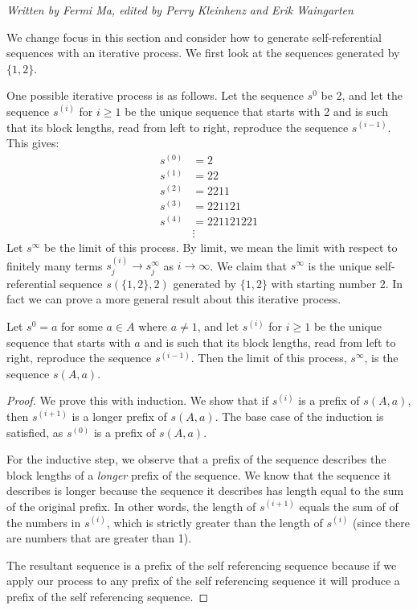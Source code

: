 \documentclass[runningheads,a4paper]{llncs}
\begin{document}
\emph{Written by Fermi Ma, edited by Perry Kleinhenz and Erik Waingarten}

We change focus in this section and consider how to generate self-referential sequences with an iterative process. We first look at the sequences generated by $\{1,2\}$.

One possible iterative process is as follows. Let the sequence $s^0$ be 2, and let the sequence $s^{(i)}$ for $i \geq 1$ be the unique sequence that starts with 2 and is such that its block lengths, read from left to right, reproduce the sequence $s^{(i-1)}$. This gives:
\begin{align*}
s^{(0)}&= 2\\
s^{(1)} &= 22\\
s^{(2)} &= 2211\\
s^{(3)}&= 221121\\
s^{(4)} &= 221121221\\
&\vdots
\end{align*}
Let $s^\infty$ be the limit of this process. 
By limit, we mean the limit with respect to finitely many terms $s^{(i)}_j \rightarrow s^\infty_j$ as $i \rightarrow \infty$. We claim that $s^\infty$ is the unique self-referential sequence $s(\{1,2\},2)$ generated by $\{1,2\}$ with starting number 2. In fact we can prove a more general result about this iterative process.

\begin{theorem}
Let $s^0 = a$ for some $a \in A$ where $a \neq 1$, and let $s^{(i)}$ for $i \geq 1$ be the unique sequence that starts with $a$ and is such that its block lengths, read from left to right, reproduce the sequence $s^{(i-1)}$. Then the limit of this process, $s^\infty$, is the sequence $s(A,a)$.
\end{theorem}

\begin{proof}
We prove this with induction. We show that if $s^{(i)}$ is a prefix of $s(A,a)$, then $s^{(i+1)}$ is a longer prefix of $s(A,a)$. The base case of the induction is satisfied, as $s^{(0)}$ is a prefix of $s(A,a)$.

For the inductive step, we observe that a prefix of the sequence describes the block lengths of a \emph{longer} prefix of the sequence. We know that the sequence it describes is longer because the sequence it describes has length equal to the sum of the original prefix. In other words, the length of $s^{(i+1)}$ equals the sum of of the numbers in $s^{(i)}$, which is strictly greater than the length of $s^{(i)}$ (since there are numbers that are greater than 1). 

The resultant sequence is a prefix of the self referencing sequence because if we apply our process to any prefix of the self referencing sequence it will produce a prefix of the self referencing sequence. 
\end{proof}
\end{document}
